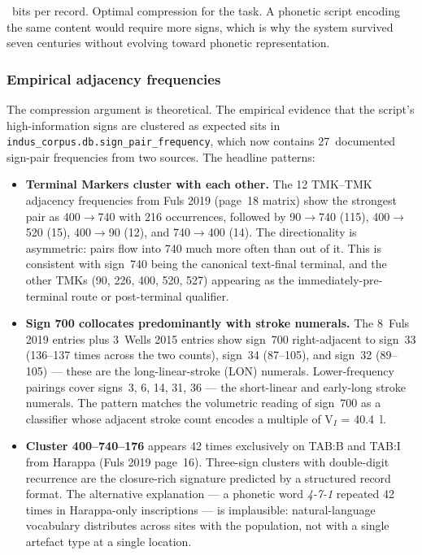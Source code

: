 ~bits per record. Optimal compression for the task.
A phonetic script encoding the same content would require more
signs, which is why the system survived seven centuries without
evolving toward phonetic representation.

\subsubsection*{Empirical adjacency frequencies}

The compression argument is theoretical. The empirical evidence
that the script's high-information signs are clustered as expected
sits in \texttt{indus\_corpus.db.sign\_pair\_frequency}, which now
contains 27~documented sign-pair frequencies from two
sources.\smartcite{WellsFuls2006}\smartcite{Wells2015} The headline
patterns:

\begin{itemize}
\item \textbf{Terminal Markers cluster with each other.} The 12
  TMK--TMK adjacency frequencies from Fuls 2019 (page~18 matrix)
  show the strongest pair as 400$\to$740 with 216 occurrences,
  followed by 90$\to$740 (115), 400$\to$520 (15), 400$\to$90 (12),
  and 740$\to$400 (14). The directionality is asymmetric: pairs
  flow into 740 much more often than out of it. This is consistent
  with sign~740 being the canonical text-final terminal, and the
  other TMKs (90, 226, 400, 520, 527) appearing as the
  immediately-pre-terminal route or post-terminal qualifier.
\item \textbf{Sign 700 collocates predominantly with stroke
  numerals.} The 8~Fuls 2019 entries plus 3~Wells 2015 entries
  show sign~700 right-adjacent to sign~33 (136--137 times across
  the two counts), sign~34 (87--105), and sign~32 (89--105) ---
  these are the long-linear-stroke (LON) numerals. Lower-frequency
  pairings cover signs~3, 6, 14, 31, 36 --- the short-linear and
  early-long stroke numerals. The pattern matches the volumetric
  reading of sign~700 as a classifier whose adjacent stroke count
  encodes a multiple of V$_I$ = \SI{40.4}{\litre}.
\item \textbf{Cluster 400--740--176} appears 42 times exclusively
  on TAB:B and TAB:I from Harappa (Fuls 2019 page~16). Three-sign
  clusters with double-digit recurrence are the closure-rich
  signature predicted by a structured record format. The
  alternative explanation --- a phonetic word \emph{4-7-1} repeated
  42 times in Harappa-only inscriptions --- is implausible:
  natural-language vocabulary distributes across sites with the
  population, not with a single artefact type at a single
  location.
\end{itemize}

